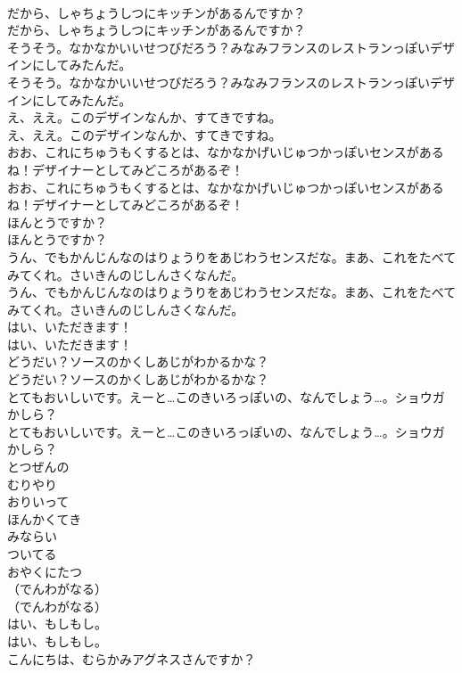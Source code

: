 \documentclass[8pt]{extreport}
\begin{document}
\begin{CJK}{UTF8}{min}
\\	だから、しゃちょうしつにキッチンがあるんですか？	
\\	だから、しゃちょうしつにキッチンがあるんですか？ 
\\	そうそう。なかなかいいせつびだろう？みなみフランスのレストランっぽいデザインにしてみたんだ。	
\\	そうそう。なかなかいいせつびだろう？みなみフランスのレストランっぽいデザインにしてみたんだ。 
\\	え、ええ。このデザインなんか、すてきですね。	
\\	え、ええ。このデザインなんか、すてきですね。 
\\	おお、これにちゅうもくするとは、なかなかげいじゅつかっぽいセンスがあるね！デザイナーとしてみどころがあるぞ！	
\\	おお、これにちゅうもくするとは、なかなかげいじゅつかっぽいセンスがあるね！デザイナーとしてみどころがあるぞ！ 
\\	ほんとうですか？	
\\	ほんとうですか？ 
\\	うん、でもかんじんなのはりょうりをあじわうセンスだな。まあ、これをたべてみてくれ。さいきんのじしんさくなんだ。	
\\	うん、でもかんじんなのはりょうりをあじわうセンスだな。まあ、これをたべてみてくれ。さいきんのじしんさくなんだ。 
\\	はい、いただきます！	
\\	はい、いただきます！ 
\\	どうだい？ソースのかくしあじがわかるかな？	
\\	どうだい？ソースのかくしあじがわかるかな？ 
\\	とてもおいしいです。えーと…このきいろっぽいの、なんでしょう…。ショウガかしら？	
\\	とてもおいしいです。えーと…このきいろっぽいの、なんでしょう…。ショウガかしら？ 
\\	とつぜんの
\\	むりやり
\\	おりいって
\\	ほんかくてき
\\	みならい
\\	ついてる
\\	おやくにたつ
\\	（でんわがなる）	
\\	（でんわがなる） 
\\	はい、もしもし。	
\\	はい、もしもし。 
\\	こんにちは、むらかみアグネスさんですか？	

\end{CJK}
\end{document}
